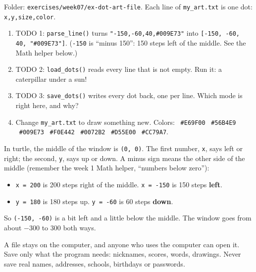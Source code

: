 \begin{exercise}
Folder: \texttt{exercises/week07/ex-dot-art-file}. Each line of \texttt{my\_art.txt} is one dot: \texttt{x,y,size,color}.
\begin{enumerate}[leftmargin=1.4em]
  \item TODO 1: \texttt{parse\_line()} turns \texttt{"-150,-60,40,\#009E73"} into \texttt{[-150, -60, 40, "\#009E73"]}.
        (\texttt{-150} is \enquote{minus 150}: 150 steps left of the middle. See the Math helper below.)
  \item TODO 2: \texttt{load\_dots()} reads every line that is not empty. Run it: a caterpillar under a sun!
  \item TODO 3: \texttt{save\_dots()} writes every dot back, one per line. Which mode is right here, and why?
  \item Change \texttt{my\_art.txt} to draw something new. Colors: ~\texttt{\#E69F00} ~\texttt{\#56B4E9} ~\texttt{\#009E73}
        ~\texttt{\#F0E442} ~\texttt{\#0072B2} ~\texttt{\#D55E00} ~\texttt{\#CC79A7}.
\end{enumerate}
\end{exercise}

\begin{tip}
In turtle, the middle of the window is \texttt{(0, 0)}. The first number, \texttt{x}, says left or right; the second, \texttt{y}, says up or down.
A minus sign means the other side of the middle (remember the week 1 Math helper, \enquote{numbers below zero}):
\begin{itemize}[leftmargin=1.2em,itemsep=0pt]
  \item \texttt{x = 200} is 200 steps right of the middle. \texttt{x = -150} is 150 steps \textbf{left}.
  \item \texttt{y = 180} is 180 steps up. \texttt{y = -60} is 60 steps \textbf{down}.
\end{itemize}
So \texttt{(-150, -60)} is a bit left and a little below the middle. The window goes from about $-300$ to $300$ both ways.
\end{tip}

\begin{tip}
A file stays on the computer, and anyone who uses the computer can open it. Save only what the program needs:
nicknames, scores, words, drawings. Never save real names, addresses, schools, birthdays or passwords.
\end{tip}

